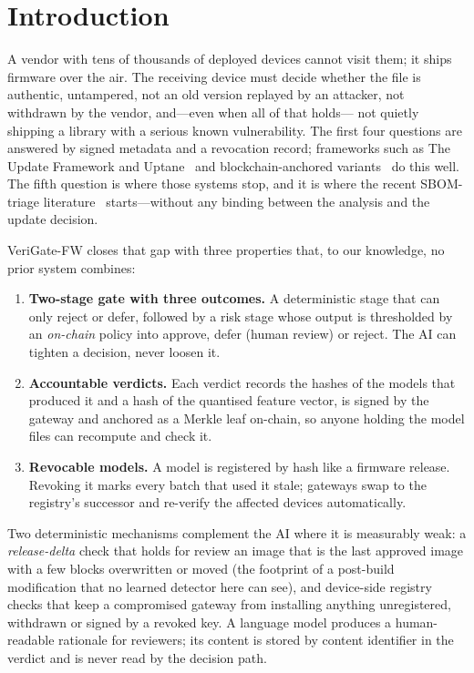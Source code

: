 \documentclass[conference]{IEEEtran}
\newcommand{\sys}{VeriGate-FW}
\begin{document}
\section{Introduction}
A vendor with tens of thousands of deployed devices cannot visit them; it ships firmware over the
air. The receiving device must decide whether the file is authentic, untampered, not an old
version replayed by an attacker, not withdrawn by the vendor, and---even when all of that holds---
not quietly shipping a library with a serious known vulnerability. The first four questions are
answered by signed metadata and a revocation record; frameworks such as The Update Framework and
Uptane~\cite{tuf,uptane} and blockchain-anchored variants~\cite{fotb,baza,didauth} do this well.
The fifth question is where those systems stop, and it is where the recent SBOM-triage
literature~\cite{sbomtriage} starts---without any binding between the analysis and the update
decision.

\sys{} closes that gap with three properties that, to our knowledge, no prior system combines:
\begin{enumerate}
\item \textbf{Two-stage gate with three outcomes.} A deterministic stage that can only reject or
defer, followed by a risk stage whose output is thresholded by an \emph{on-chain} policy into
approve, defer (human review) or reject. The AI can tighten a decision, never loosen it.
\item \textbf{Accountable verdicts.} Each verdict records the hashes of the models that produced
it and a hash of the quantised feature vector, is signed by the gateway and anchored as a Merkle
leaf on-chain, so anyone holding the model files can recompute and check it.
\item \textbf{Revocable models.} A model is registered by hash like a firmware release. Revoking
it marks every batch that used it stale; gateways swap to the registry's successor and re-verify
the affected devices automatically.
\end{enumerate}
Two deterministic mechanisms complement the AI where it is measurably weak: a
\emph{release-delta} check that holds for review an image that is the last approved image with a
few blocks overwritten or moved (the footprint of a post-build modification that no learned
detector here can see), and device-side registry checks that keep a compromised gateway from
installing anything unregistered, withdrawn or signed by a revoked key. A language model produces
a human-readable rationale for reviewers; its content is stored by content identifier in the
verdict and is never read by the decision path.
\end{document}
